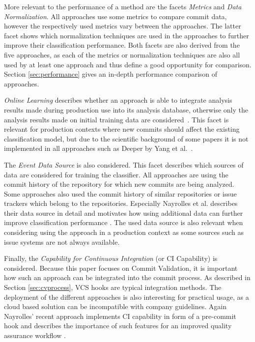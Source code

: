More relevant to the performance of a method are the facets \textit{Metrics} and \textit{Data Normalization}. All approaches use some metrics to compare commit data, however the respectively used metrics vary between the approaches.
The latter facet shows which normalization techniques are used in the approaches to further improve their classification performance.
Both facets are also derived from the five approaches, as each of the metrics or normalization techniques are also all used by at least one approach and thus define a good opportunity for comparison. Section \ref{sec:performance} gives an in-depth performance comparison of approaches.

\textit{Online Learning} describes whether an approach is able to integrate analysis results made during production use into its analysis database, otherwise only the analysis results made on initial training data are considered~\cite{MAL-018}. This facet is relevant for production contexts where new commits should affect the existing classification model, but due to the scientific background of some papers it is not implemented in all approaches such as Deeper by Yang et al.~\cite{Yang2015}.

The \textit{Event Data Source} is also considered. This facet describes which sources of data are considered for training the classifier. All approaches are using the commit history of the repository for which new commits are being analyzed. Some approaches also used the commit history of similar repositories or issue trackers which belong to the repositories.
Especially Nayrolles et al. describes their data source in detail and motivates how using additional data can further improve classification performance \cite{Nayrolles2018}. The used data source is also relevant when considering using the approach in a production context as some sources such as issue systems are not always available. 

Finally, the \textit{Capability for Continuous Integration} (or CI Capability) is considered. Because this paper focuses on Commit Validation, it is important how such an approach can be integrated into the commit process. As described in Section \ref{sec:cvprocess}, VCS hooks are typical integration methods. The deployment of the different approaches is also interesting for practical usage, as a cloud based solution can be incompatible with company guidelines. Again Nayrolles' recent approach implements CI capability in form of a pre-commit hook and describes the importance of such features for an improved quality assurance workflow \cite{Nayrolles2018}.

